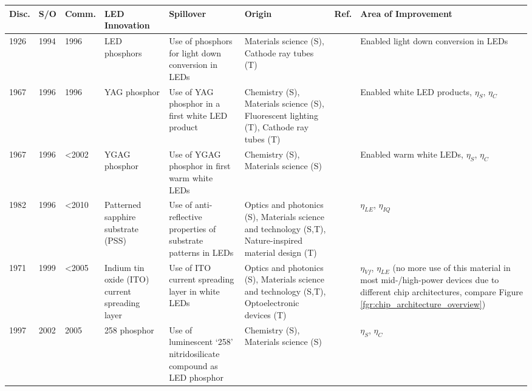 \documentclass[twoside,twocolumn,9pt]{article}
\begin{document}
\begin{table}[h]
    \small
    \centering
    \begin{tabularx}{\textwidth}{|l|l|l|X|X|X|l|X|}
    \hline
        \textbf{Disc.} & \textbf{S/O} & \textbf{Comm.} & \textbf{LED Innovation} & \textbf{Spillover} & \textbf{Origin} & \textbf{Ref.} & \textbf{Area of Improvement} \\ \hline
        1926 & 1994 & 1996 & LED phosphors & Use of phosphors for light down conversion in LEDs & Materials science (S), Cathode ray tubes (T) & \cite{bright1972electric}\cite{shimizu1994sheet}\cite{cho2017white} & Enabled light down conversion in LEDs \\ \hline
        1967 & 1996 & 1996 & YAG phosphor & Use of YAG phosphor in a first white LED product & Chemistry (S), Materials science (S), Fluorescent lighting (T), Cathode ray tubes (T) & \cite{blasse1967new}\cite{bando1996}\cite{bando1998development}\cite{shimizu1999light}\cite{cho2017white} & Enabled white LED products, $\eta_S$, $\eta_C$ \\ \hline
        1967 & 1996 & <2002 & YGAG phosphor & Use of YGAG phosphor in first warm white LEDs & Chemistry (S), Materials science (S) &\cite{holloway1969optical}\cite{bando1998development}\cite{shimizu1999light}\cite{Mueller2002} & Enabled warm white LEDs, $\eta_S$, $\eta_C$ \\ \hline
        1982 & 1996 & <2010 & Patterned sapphire substrate (PSS) & Use of anti-reflective properties of substrate patterns in LEDs & Optics and photonics (S), Materials science and technology (S,T), Nature-inspired material design (T) &\cite{moharam1982diffraction}\cite{krames1998ordered}\cite{feezell2018invention}\cite{Narukawa_2010} & $\eta_{LE}$, $\eta_{IQ}$ \\ \hline
        1971 & 1999 & <2005 & Indium tin oxide (ITO) current spreading layer & Use of ITO current spreading layer in white LEDs & Optics and photonics (S), Materials science and technology (S,T), Optoelectronic devices (T) & \cite{vossen1971rf}\cite{fraser1972highly}\cite{margalith1999indium} & $\eta_{Vf}$, $\eta_{LE}$ (no more use of this material in most mid-/high-power devices due to different chip architectures, compare Figure \ref{fgr:chip_architecture_overview}) \\ \hline
        1997 & 2002 & 2005 & 258 phosphor & Use of luminescent ‘258’ nitridosilicate compound as LED phosphor & Chemistry (S), Materials science (S) &\cite{Huppertz1997}\cite{mueller2004phosphor}\cite{MuellerMach2005} & $\eta_S$, $\eta_C$ \\ \hline

\end{tabularx}
\end{table}
\end{document}
